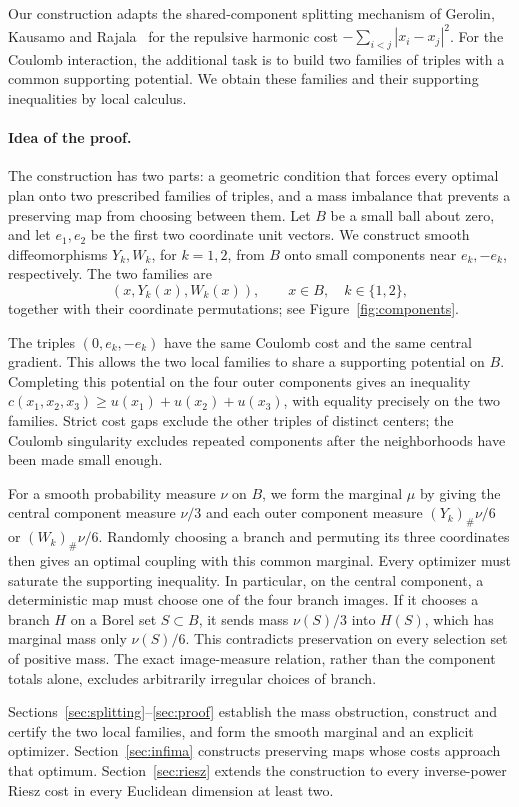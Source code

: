 Our construction adapts the shared-component splitting mechanism
of Gerolin, Kausamo and Rajala~\cite{GKR2019} for the repulsive
harmonic cost \(-\sum_{i<j}|x_i-x_j|^2\).
For the Coulomb interaction, the additional task is to build two
families of triples with a common supporting potential. We obtain
these families and their supporting inequalities by local calculus.

\paragraph{Idea of the proof.}
The construction has two parts: a geometric condition that forces every
optimal plan onto two prescribed families of triples, and a mass imbalance that
prevents a preserving map from choosing between them.
Let \(B\) be a small ball about zero, and let \(e_1,e_2\) be the first
two coordinate unit vectors. We construct smooth diffeomorphisms \(Y_k,W_k\), for \(k=1,2\), from \(B\) onto small
components near \(e_k,-e_k\), respectively. The two families are
\[
 (x,Y_k(x),W_k(x)),\qquad x\in B,\quad k\in\{1,2\},
\]
together with their coordinate permutations; see
Figure~\ref{fig:components}.

The triples \((0,e_k,-e_k)\) have the same Coulomb cost and the same
central gradient. This allows the two local families to share a
supporting potential on \(B\). Completing this potential on the four
outer components gives an inequality
\(c(x_1,x_2,x_3)\ge u(x_1)+u(x_2)+u(x_3)\), with equality precisely
on the two families. Strict cost gaps exclude the other triples of distinct centers;
the Coulomb singularity excludes repeated components after the
neighborhoods have been made small enough.

For a smooth probability measure \(\nu\) on \(B\), we form the
marginal \(\mu\) by giving the central component measure \(\nu/3\)
and each outer component measure \((Y_k)_\#\nu/6\) or
\((W_k)_\#\nu/6\). Randomly choosing a branch
and permuting its three coordinates then gives an optimal coupling
with this common marginal. Every optimizer must saturate the supporting
inequality. In particular, on the central component, a deterministic
map must choose one of the four branch images. If it chooses a branch
\(H\) on a Borel set \(S\subset B\), it sends mass \(\nu(S)/3\)
into \(H(S)\), which has marginal mass only \(\nu(S)/6\).
This contradicts preservation on every selection set of positive mass.
The exact image-measure relation, rather than the component totals
alone, excludes arbitrarily irregular choices of branch.



Sections~\ref{sec:splitting}--\ref{sec:proof} establish the mass obstruction,
construct and certify the two local families, and form the smooth marginal
and an explicit optimizer. Section~\ref{sec:infima} constructs preserving
maps whose costs approach that optimum.
Section~\ref{sec:riesz} extends the construction to every inverse-power
Riesz cost in every Euclidean dimension at least two.
